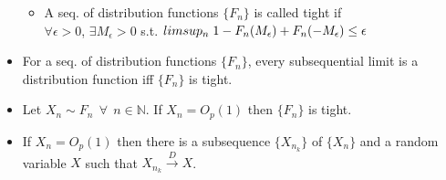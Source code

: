 \documentclass[12pt, A4]{article}
\begin{document}
\begin{itemize}
\begin{itemize}
		\item A seq. of distribution functions $\{F_n\}$ is called tight if \\ $\forall \epsilon>0$, $\exists M_\epsilon>0$ s.t. $limsup_n \hspace{0.1cm}1-F_n(M_\epsilon)+F_n(-M_\epsilon) \leq \epsilon$
	\end{itemize}
	\item For a seq. of distribution functions $\{F_n\}$, every subsequential limit is a distribution function iff $\{F_n\}$ is tight.
	\item Let $X_n \sim F_n \;\, \forall\;\, n\in \mathbb{N}$. If $X_n = O_p(1)$ then $\{F_n\}$ is tight.
	\item If $X_n = O_p(1)$ then there is a subsequence $\{X_{n_k}\}$ of $\{X_n\}$ and a random variable $X$ such that $X_{n_k} \xrightarrow{D} X$.
\end{itemize}
\bigskip
\end{document}
